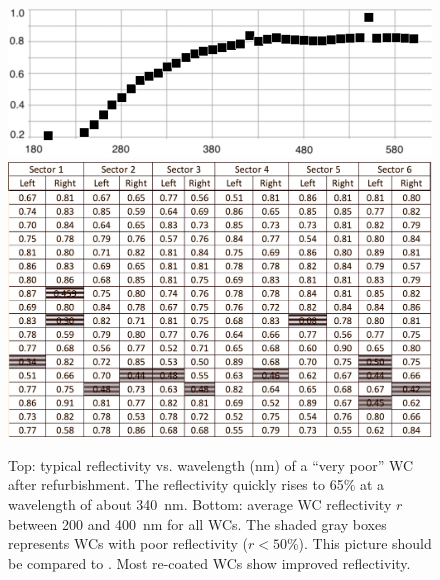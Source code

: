 \begin{figure}[ht]
	\centering
	\includegraphics[width=0.98\columnwidth,keepaspectratio]{img/winstoConeSample1Reflectivity.png}
	\includegraphics[width=0.98\columnwidth,keepaspectratio]{img/wcStatusAfter.png}
	\caption{Top: typical reflectivity vs. wavelength (nm) of a ``very poor'' WC after refurbishment. The
          reflectivity quickly rises to 65\% at a wavelength of about 340~nm. Bottom: average WC reflectivity $r$
          between 200 and 400~nm for all WCs. The shaded gray boxes represents WCs with poor reflectivity
          ($r < 50$\%). This picture should be compared to . Most re-coated WCs show improved
          reflectivity.}
	\label{fig:wcStatusAfter}
\end{figure}
